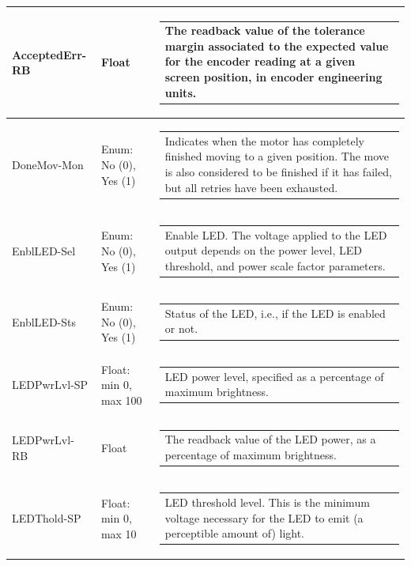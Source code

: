 \documentclass[openany]{article}
\begin{document}
\begin{longtable}{| m{4.5cm} m{2.5cm}  m{7.0cm} |}
        AcceptedErr-RB & Float & \begin{tabular}{@{}m{6cm}@{}}
                The readback value of the tolerance margin associated to the expected value for the encoder reading at a given screen position, in encoder engineering units.
            \end{tabular} \hypertarget{pv:done-mov-mon}{}\\ \hline
        DoneMov-Mon & Enum: No (0), Yes (1) & \begin{tabular}{@{}m{6cm}@{}}
                Indicates when the motor has completely finished moving to a given position. The move is also considered to be finished if it has failed, but all retries have been exhausted.
            \end{tabular} \hypertarget{pv:enbl-led}{}\\ \hline
        EnblLED-Sel & Enum: No (0), Yes (1) & \begin{tabular}{@{}m{6cm}@{}}
                Enable LED. The voltage applied to the LED output depends on the power level, LED threshold, and power scale factor parameters.
            \end{tabular} \hypertarget{}{}\\ \hline
        EnblLED-Sts & Enum: No (0), Yes (1) & \begin{tabular}{@{}m{6cm}@{}}
                Status of the LED, i.e., if the LED is enabled or not.
            \end{tabular} \hypertarget{pv:led-pwr-lvl}{}\\ \hline
        LEDPwrLvl-SP & Float: min 0, max 100 & \begin{tabular}{@{}m{6cm}@{}}
                LED power level, specified as a percentage of maximum brightness.
            \end{tabular} \hypertarget{}{}\\ \hline
        LEDPwrLvl-RB & Float & \begin{tabular}{@{}m{6cm}@{}}
                The readback value of the LED power, as a percentage of maximum brightness.
            \end{tabular} \hypertarget{pv:led-thold}{}\\ \hline
        LEDThold-SP & Float: min 0, max 10 & \begin{tabular}{@{}m{6cm}@{}}
                LED threshold level. This is the minimum voltage necessary for the LED to emit (a perceptible amount of) light.

\end{tabular}
\end{longtable}
\end{document}
